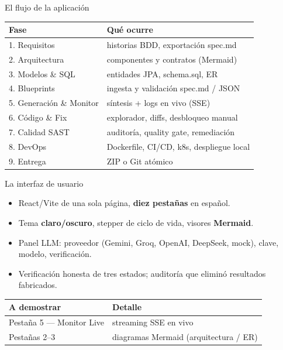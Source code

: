 \documentclass[aspectratio=169,11pt]{beamer}
\begin{document}
\begin{frame}{El flujo de la aplicación}
  \begin{center}
    \begin{tabular}{p{}p{}}
      \toprule
      \textbf{Fase} & \textbf{Qué ocurre} \\
      \midrule
      1. Requisitos & historias BDD, exportación spec.md \\
      2. Arquitectura & componentes y contratos (Mermaid) \\
      3. Modelos \& SQL & entidades JPA, schema.sql, ER \\
      4. Blueprints & ingesta y validación spec.md / JSON \\
      5. Generación \& Monitor & síntesis + logs en vivo (SSE) \\
      6. Código \& Fix & explorador, diffs, desbloqueo manual \\
      7. Calidad SAST & auditoría, quality gate, remediación \\
      8. DevOps & Dockerfile, CI/CD, k8s, despliegue local \\
      9. Entrega & ZIP o Git atómico \\
      \bottomrule
    \end{tabular}
  \end{center}
\end{frame}

\begin{frame}{La interfaz de usuario}
  \begin{itemize}
    \item React/Vite de una sola página, \textbf{diez pestañas} en español.
    \item Tema \textbf{claro/oscuro}, stepper de ciclo de vida, visores \textbf{Mermaid}.
    \item Panel LLM: proveedor (Gemini, Groq, OpenAI, DeepSeek, mock), clave, modelo, verificación.
    \item Verificación honesta de tres estados; auditoría que eliminó resultados fabricados.
  \end{itemize}
  \begin{center}
    \begin{tabular}{p{}p{}}
      \toprule
      \textbf{A demostrar} & \textbf{Detalle} \\
      \midrule
      Pestaña 5 — Monitor Live & streaming SSE en vivo \\
      Pestañas 2--3 & diagramas Mermaid (arquitectura / ER) \\
      \bottomrule
    \end{tabular}
  \end{center}
\end{frame}
\end{document}
